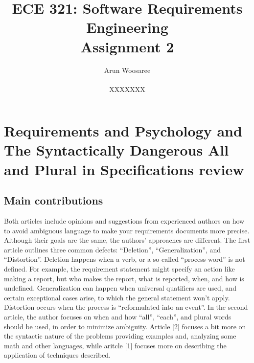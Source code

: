 \documentclass[letterpaper,12pt]{article}
\title{ECE 321: Software Requirements Engineering \\ Assignment 2}
\author{Arun Woosaree \\ \\ XXXXXXX}
\begin{document}
\maketitle

\section{Requirements and Psychology
  and
  The Syntactically Dangerous All and Plural in Specifications
  review}

\subsection{Main contributions}
Both articles include opinions and suggestions from experienced authors on how
to avoid ambiguous language to make your requirements documents more precise.
Although their goals are the same, the authors' approaches are different. The
first article outlines three common defects: ``Deletion'', ``Generalization'',
and ``Distortion''. Deletion happens when a verb, or a so-called
``process-word'' is not defined. For example, the requirement statement might
specify an action like making a report, but who makes the report, what is
reported, when, and how is undefined. Generalization can happen when universal
quatifiers are used, and certain exceptional cases arise, to which the general
statement won't apply. Distortion occurs when the process is ``reformulated into
an event''. In the second article, the author focuses on when and how ``all'',
``each'', and plural words should be used, in order to minimize ambiguity.
Article [2] focuses a bit more on the syntactic nature of the problems providing
examples and, analyzing some math and other languages, while aritcle [1] focuses
more on describing the application of techniques described.
\end{document}
